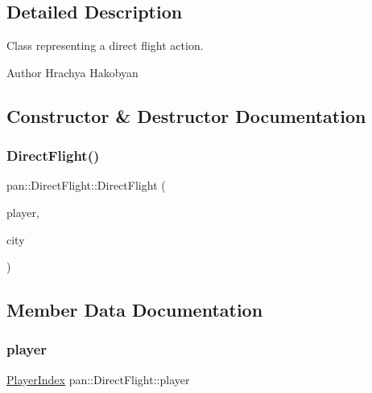 \subsection{Detailed Description}
Class representing a direct flight action. 

\begin{DoxyAuthor}{Author}
Hrachya Hakobyan 
\end{DoxyAuthor}


\subsection{Constructor \& Destructor Documentation}
\mbox{\label{classpan_1_1_direct_flight_adb9d5acdd3f9fd5288861dd53f06dfe7}} 
\subsubsection{\texorpdfstring{Direct\+Flight()}{DirectFlight()}}
{\footnotesize\ttfamily pan\+::\+Direct\+Flight\+::\+Direct\+Flight (\begin{DoxyParamCaption}\item[{\hyperlink{namespacepan_a0cdabf874fbf1bb3a1f0152d108c2909}{Player\+Index}}]{player,  }\item[{\hyperlink{namespacepan_afaed28aa6603153dcc062a028602d697}{City\+Index}}]{city }\end{DoxyParamCaption})}



\subsection{Member Data Documentation}
\mbox{\label{classpan_1_1_direct_flight_afe5a2a1f145f99e778cb3cff80b7d54b}} 
\subsubsection{\texorpdfstring{player}{player}}
{\footnotesize\ttfamily \hyperlink{namespacepan_a0cdabf874fbf1bb3a1f0152d108c2909}{Player\+Index} pan\+::\+Direct\+Flight\+::player}

